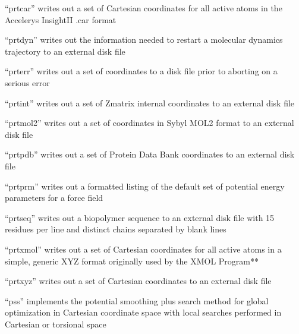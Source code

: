 \documentclass[letterpaper,11pt,english]{sphinxmanual}
\begin{document}

“prtcar” writes out a set of Cartesian coordinates for all active atoms in the Accelerys InsightII .car format


“prtdyn” writes out the information needed to restart a molecular dynamics trajectory to an external disk file


“prterr” writes out a set of coordinates to a disk file prior to aborting on a serious error


“prtint” writes out a set of Z\sphinxhyphen{}matrix internal coordinates to an external disk file


“prtmol2” writes out a set of coordinates in Sybyl MOL2 format to an external disk file


“prtpdb” writes out a set of Protein Data Bank coordinates to an external disk file


“prtprm” writes out a formatted listing of the default set of potential energy parameters for a force field


“prtseq” writes out a biopolymer sequence to an external disk file with 15 residues per line and distinct chains separated by blank lines


“prtxmol” writes out a set of Cartesian coordinates for all active atoms in a simple, generic XYZ format originally used by the XMOL Program**


“prtxyz” writes out a set of Cartesian coordinates to an external disk file


“pss” implements the potential smoothing plus search method for global optimization in Cartesian coordinate space with local searches performed in Cartesian or torsional space

\end{document}
